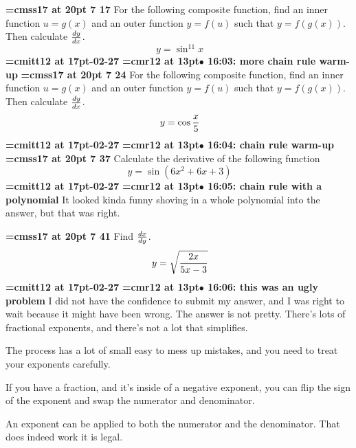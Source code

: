 {\medskip\noindent\bf\font\titlefont=cmss17 at 20pt 7 17}\medskip
For the following composite function, find an inner function
$u = g(x)$ and an outer function $y = f(u)$ such that
$y = f(g(x))$. Then calculate $dy \over dx$.
$$\
y = \sin^{11}x
$$
{\medskip\noindent\bf\font\titlefont=cmitt12 at 17pt-02-27}\medskip
{\smallskip\noindent\bf\font\titlefont=cmr12 at 13pt\titlefont $\bullet$ 16:03: more chain rule warm-up}\smallskip
\xrdef{node87}
{\medskip\noindent\bf\font\titlefont=cmss17 at 20pt 7 24}\medskip
For the following composite function, find an inner function
$u = g(x)$ and an outer function $y = f(u)$ such that
$y = f(g(x))$. Then calculate $dy \over dx$.
$$\
y = \cos{x \over 5}
$$
{\medskip\noindent\bf\font\titlefont=cmitt12 at 17pt-02-27}\medskip
{\smallskip\noindent\bf\font\titlefont=cmr12 at 13pt\titlefont $\bullet$ 16:04: chain rule warm-up}\smallskip
\xrdef{node88}
{\medskip\noindent\bf\font\titlefont=cmss17 at 20pt\titlefont 3 7 37}\medskip
Calculate the derivative of the following function
$$\
y = \sin(6x^2 + 6x + 3)
$$
{\medskip\noindent\bf\font\titlefont=cmitt12 at 17pt-02-27}\medskip
{\smallskip\noindent\bf\font\titlefont=cmr12 at 13pt\titlefont $\bullet$ 16:05: chain rule with a polynomial}\smallskip
It looked kinda funny shoving in a whole polynomial into the answer, but that was right.
\par

\xrdef{node89}
{\medskip\noindent\bf\font\titlefont=cmss17 at 20pt 7 41}\medskip
Find ${dx \over dy}$.
$$\
y = \sqrt{2x \over 5x - 3}
$$
{\medskip\noindent\bf\font\titlefont=cmitt12 at 17pt-02-27}\medskip
{\smallskip\noindent\bf\font\titlefont=cmr12 at 13pt\titlefont $\bullet$ 16:06: this was an ugly problem}\smallskip
I did not have the confidence to submit my answer, and I was right to wait because it might have been wrong. The answer is not pretty. There's lots of fractional exponents, and there's not a lot that simplifies.
\par

The process has a lot of small easy to mess up mistakes, and you need to treat your exponents carefully.
\par

If you have a fraction, and it's inside of a negative exponent, you can flip the sign of the exponent and swap the numerator and denominator.
\par

An exponent can be applied to both the numerator and the denominator. That does indeed work it is legal.
\par

